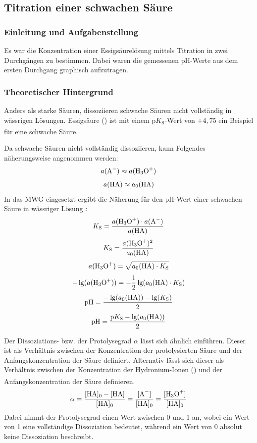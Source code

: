 \documentclass[
	a4paper,										%
	12pt,											%
	twoside,										%
	headsepline,								%
	footsepline,									%
	captions=tableheading,					%
]{scrartcl}
\newcommand{\zitat}[1]{\textsuperscript{\cite{#1}}}
\newcommand{\formel}[2]{				%
	\begin{equation}
		\label{eq: #1}							%
		#2											%
	\end{equation}}
\begin{document}
\newpage

	
\subsection{Titration einer schwachen Säure}

\subsubsection{Einleitung und Aufgabenstellung}

Es war die Konzentration einer Essigsäurelösung mittels Titration in zwei Durchgängen zu bestimmen.
Dabei waren die gemessenen pH-Werte aus dem ersten Durchgang graphisch aufzutragen.

\subsubsection{Theoretischer Hintergrund}

Anders als starke Säuren, dissoziieren schwache Säuren nicht vollständig in wässrigen Lösungen.
Essigsäure () ist mit einem p$K_{\mathrm{S}}$-Wert von $+4,75$ ein Beispiel für eine schwache Säure.\zitat{scs}

Da schwache Säuren nicht vollständig dissoziieren, kann Folgendes näherungsweise angenommen werden:
\formel{ess1}{a(\ce{A-}) \approx a(\ce{H3O+})}
\formel{ess2}{a(\ce{HA}) \approx a_{0}(\ce{HA})}
In das MWG  eingesetzt ergibt die Näherung für den pH-Wert einer schwachen Säure in wässriger Lösung :
\formel{kses}{K_{\mathrm{S}} = \frac{a(\ce{H3O+}) \cdot a({\ce{A-}})}{a(\ce{HA})}}
\formel{hh1}{K_{\mathrm{S}} = \frac{a(\ce{H3O+})^2}{a_{0}(\ce{HA})}}
\formel{hh2}{a(\ce{H3O+}) = \sqrt{a_{0}(\ce{HA}) \cdot K_{\mathrm{S}}}}
\formel{hh3}{-\lg(a(\ce{H3O+})) = -\frac{1}{2}\lg(a_{0}(\ce{HA}) \cdot K_{\mathrm{S}})}
\formel{hh4}{\mathrm{pH} = \frac{-\lg(a_{0}(\ce{HA})) -\lg(K_{\mathrm{S}})}{2}}
\formel{hh5}{\mathrm{pH} = \frac{\mathrm{p}K_{\mathrm{S}} -\lg(a_{0}(\ce{HA}))}{2}}

Der Dissoziations- bzw. der Protolysegrad $\alpha$ lässt sich ähnlich einführen. Dieser ist als Verhältnis zwischen der Konzentration der protolysierten Säure und der Anfangskonzentration der Säure definiert.
Alternativ lässt sich dieser als Verhältnis zwischen der Konzentration der Hydronium-Ionen () und der Anfangskonzentration der Säure definieren.\zitat{alpha}
\formel{a1}{\alpha = \frac{[\ce{HA}]_{0} - [\ce{HA}]}{[\ce{HA}]_{0}} = \frac{[\ce{A-}]}{[\ce{HA}]_{0}} = \frac{[\ce{H3O+}]}{[\ce{HA}]_{0}}}
Dabei nimmt der Protolysegrad einen Wert zwischen 0 und 1 an, wobei ein Wert von 1 eine vollständige Dissoziation bedeutet,
während ein Wert von 0 absolut keine Dissoziation beschreibt.\\
\end{document}
